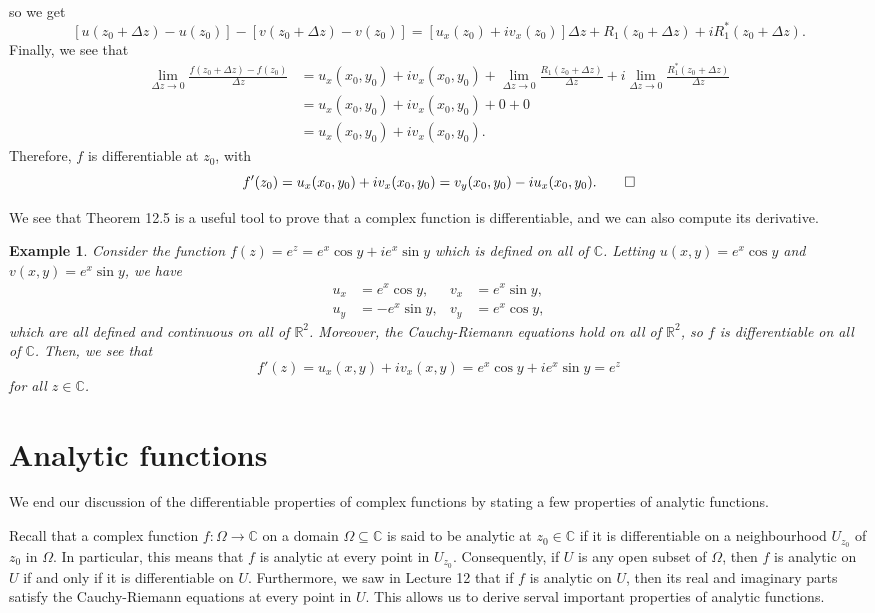 \documentclass[10pt]{article}
\makeatletter
\newcommand{\R}{\mathbb{R}}
\newcommand{\C}{\mathbb{C}}
\theoremstyle{newstyle}
\newtheorem{exmp}[thm]{Example}
\newenvironment{pf}[1][\proofname]{\par
  \pushQED{\qed}%
  \normalfont \topsep0\p@\relax
  \trivlist
  \item[\hskip\labelsep\scshape
  #1\@addpunct{.}]\ignorespaces
}{%
  \popQED\endtrivlist\@endpefalse
}
\makeatother
\begin{document}
\begin{pf}
\begin{align*}
\end{align*}
so we get 
\[ [u(z_0 + \Delta z) - u(z_0)] - [v(z_0 + \Delta z) - v(z_0)]
= [u_x(z_0) + iv_x(z_0)]\Delta z + R_1(z_0 + \Delta z) + iR^*_1(z_0 + \Delta z). \]
Finally, we see that 
\begin{align*}
    \lim_{\Delta z \to 0} \frac{f(z_0 + \Delta z) - f(z_0)}{\Delta z}
    &= u_x(x_0, y_0) + iv_x(x_0, y_0) + \lim_{\Delta z \to 0} \frac{R_1(z_0 + \Delta z)}{\Delta z} 
    + i \lim_{\Delta z \to 0} \frac{R^*_1(z_0 + \Delta z)}{\Delta z} \\
    &= u_x(x_0, y_0) + iv_x(x_0, y_0) + 0 + 0 \\ 
    &=  u_x(x_0, y_0) + iv_x(x_0, y_0).
\end{align*}
Therefore, $f$ is differentiable at $z_0$, with 
\[ f'(z_0) =  u_x(x_0, y_0) + iv_x(x_0, y_0) =  v_y(x_0, y_0) - iu_x(x_0, y_0). \qedhere \]
\end{pf}

We see that Theorem 12.5 is a useful tool to prove that a complex function is differentiable, and we can
also compute its derivative. 

\begin{exmp}
Consider the function $f(z) = e^z = e^x \cos y + ie^x \sin y$ which is defined on all of $\C$. Letting 
$u(x, y) = e^x \cos y$ and $v(x, y) = e^x \sin y$, we have 
\begin{align*}
    u_x &= e^x \cos y, & v_x &= e^x \sin y, \\
    u_y &= -e^x \sin y, & v_y &= e^x \cos y, 
\end{align*}
which are all defined and continuous on all of $\R^2$. Moreover, the Cauchy-Riemann equations hold 
on all of $\R^2$, so $f$ is differentiable on all of $\C$. Then, we see that 
\[ f'(z) = u_x(x, y) + iv_x(x, y) = e^x \cos y + ie^x \sin y = e^z \]
for all $z \in \C$.
\end{exmp}

\newpage 
\section{Analytic functions}

We end our discussion of the differentiable properties of complex functions by stating a few properties of analytic functions.

Recall that a complex function $f : \Omega \to \C$ on a domain $\Omega \subseteq \C$ is said to be 
analytic at $z_0 \in \C$ if it is differentiable on a neighbourhood $U_{z_0}$ of $z_0$ in $\Omega$. 
In particular, this means that $f$ is analytic at every point in $U_{z_0}$. Consequently, if 
$U$ is any open subset of $\Omega$, then $f$ is analytic on $U$ if and only if it is 
differentiable on $U$. Furthermore, we saw in Lecture 12 that if $f$ is analytic on $U$, then 
its real and imaginary parts satisfy the Cauchy-Riemann equations at every point in $U$. 
This allows us to derive serval important properties of analytic functions. 
\end{document}
